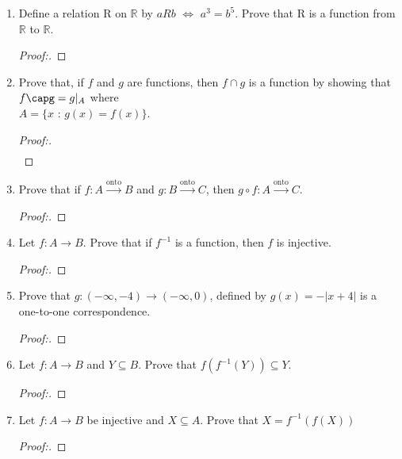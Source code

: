 \documentclass[11pt]{article}
\begin{document}
\begin{enumerate}
    \item Define a relation R on $\mathbb{R}$ by $aRb$ $\iff$ $a^3=b^5$. Prove that R is a function from $\mathbb{R}$ to $\mathbb{R}.$
       \begin{proof}[Proof:\nopunct]
        \end{proof}
        
    \item Prove that, if $f$ and $g$ are functions, then $f \cap g$ is a function by showing that $f\capg = g|_{A}$ where \\ $A = \{x$ : $g(x) = f(x) \}.$
       \begin{proof}[Proof:\nopunct]
            \begin{align*}
                
            \end{align*}
        \end{proof}
        
    \item Prove that if $f:A \xrightarrow{\text{onto}} B$ and $g:B\xrightarrow{\text{onto}} C$, then $g\circ f:A \xrightarrow{\text{onto}} C.$
        \begin{proof}[Proof:\nopunct]
        \end{proof}
        
    \item Let $f:A\xrightarrow{} B$. Prove that if $f^{-1}$ is a function, then $f$ is injective.
       \begin{proof}[Proof:\nopunct]
        \end{proof}
        
    \item Prove that $g:(-\infty, -4)\rightarrow(-\infty,0)$, defined by $g(x) = -|x+4|$ is a one-to-one correspondence.
       \begin{proof}[Proof:\nopunct]
        \end{proof}
        
    \item Let $f:A \rightarrow B$ and $Y \subseteq B.$ Prove that $f(f^{-1}(Y)) \subseteq Y.$
        \begin{proof}[Proof:\nopunct]
        \end{proof}
        
    \item Let $f:A \rightarrow B$ be injective and $X \subseteq A.$ \newline Prove that $X = f^{-1}(f(X))$ 
        \begin{proof}[Proof:\nopunct]
        \end{proof}
    
\end{enumerate}
\end{document}

